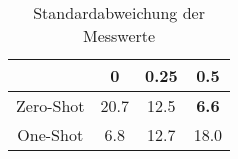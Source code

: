 \bgroup
\def\arraystretch{2}
\begin{table}[H]
	\vspace{.5cm}
	\centering		
	\begin{center}
		\begin{tabular}{|c||c|c|c|}
			\hline 
			& 0 & 0.25 & 0.5 \\
			\hline 
			\hline
			Zero-Shot & 20.7 & 12.5 & \textbf{6.6} \\
			\hline
			One-Shot & 6.8 & 12.7 & 18.0 \\
			\hline
		\end{tabular} 
	\end{center}
	\caption{Standardabweichung der Messwerte}
	\label{fig:line-var}
	\vspace{-.8cm}
\end{table}
\egroup